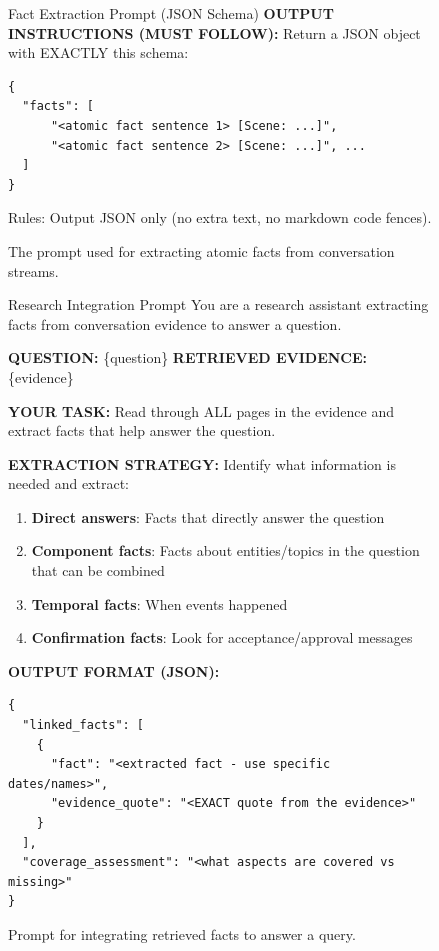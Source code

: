 \documentclass{article}
\theoremstyle{plain}
\theoremstyle{definition}
\theoremstyle{remark}
\begin{document}
\begin{figure}[htb]
\begin{AIbox}[width=\textwidth]{Fact Extraction Prompt (JSON Schema)}
\textbf{OUTPUT INSTRUCTIONS (MUST FOLLOW):} \newline
Return a JSON object with EXACTLY this schema:
\begin{verbatim}
{
  "facts": [
      "<atomic fact sentence 1> [Scene: ...]", 
      "<atomic fact sentence 2> [Scene: ...]", ...
  ]
}
\end{verbatim}
Rules: Output JSON only (no extra text, no markdown code fences).
\end{AIbox}
\caption{The prompt used for extracting atomic facts from conversation streams.}
\label{fig:fact_extraction_prompt}
\end{figure}

\begin{figure}[htb]
\begin{AIbox}[width=\textwidth]{Research Integration Prompt}
\footnotesize
You are a research assistant extracting facts from conversation evidence to answer a question.

\textbf{QUESTION:} \{question\} \newline
\textbf{RETRIEVED EVIDENCE:} \{evidence\}

\textbf{YOUR TASK:} \newline
Read through ALL pages in the evidence and extract facts that help answer the question.

\textbf{EXTRACTION STRATEGY:} \newline
Identify what information is needed and extract:
\begin{enumerate}
    \item \textbf{Direct answers}: Facts that directly answer the question
    \item \textbf{Component facts}: Facts about entities/topics in the question that can be combined
    \item \textbf{Temporal facts}: When events happened
    \item \textbf{Confirmation facts}: Look for acceptance/approval messages
\end{enumerate}

\textbf{OUTPUT FORMAT (JSON):}
\begin{verbatim}
{
  "linked_facts": [
    {
      "fact": "<extracted fact - use specific dates/names>",
      "evidence_quote": "<EXACT quote from the evidence>"
    }
  ],
  "coverage_assessment": "<what aspects are covered vs missing>"
}
\end{verbatim}
\end{AIbox}
\caption{Prompt for integrating retrieved facts to answer a query.}
\label{fig:research_integration_prompt}
\end{figure}
\end{document}

